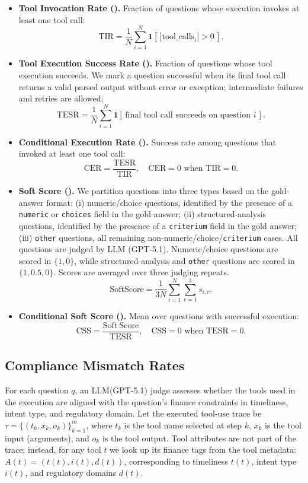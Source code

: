 \begin{itemize}[leftmargin=*]
\item \textbf{Tool Invocation Rate (\tir).} Fraction of questions whose execution invokes at least one tool call:
\[\mathrm{TIR}=\frac{1}{N}\sum_{i=1}^{N}\mathbf{1}\!\left[\,|\mathrm{tool\_calls}_i|>0\,\right].\]
\item \textbf{Tool Execution Success Rate (\tesr).} Fraction of questions whose tool execution succeeds.
We mark a question successful when its final tool call returns a valid parsed output without error or exception; intermediate failures and retries are allowed:
  \[\mathrm{TESR}=\frac{1}{N}\sum_{i=1}^{N}\mathbf{1}\!\left[\,\text{final tool call succeeds on question } i\,\right].\]
\item \textbf{Conditional Execution Rate (\cer).} Success rate among questions that invoked at least one tool call: 
  \[\mathrm{CER}=\frac{\mathrm{TESR}}{\mathrm{TIR}},\quad \mathrm{CER}=0 \text{ when } \mathrm{TIR}=0.\]
\item \textbf{Soft Score (\soft).} 
We partition questions into three types based on the gold-answer format:
(i) numeric/choice questions, identified by the presence of a \texttt{numeric} or \texttt{choices} field in the gold answer;
(ii) structured-analysis questions, identified by the presence of a \texttt{criterium} field in the gold answer;
(iii) \texttt{other} questions, all remaining non-numeric/choice/\texttt{criterium} cases.
All questions are judged by LLM (GPT-5.1). Numeric/choice questions are scored in $\{1,0\}$, while structured-analysis and \texttt{other} questions are scored in $\{1,0.5,0\}$. Scores are averaged over three judging repeats.
\[\mathrm{SoftScore}=\frac{1}{3N}\sum_{i=1}^{N}\sum_{r=1}^{3} s_{i,r}.\]
\item \textbf{Conditional Soft Score (\css).} Mean \soft{} over questions with successful execution:
  \[\mathrm{CSS}=\frac{\mathrm{Soft\ Score}}{\mathrm{TESR}},\quad \mathrm{CSS}=0 \text{ when } \mathrm{TESR}=0.\]
\end{itemize}



\subsection{Compliance Mismatch Rates}

For each question $q$, an LLM(GPT-5.1) judge assesses whether the tools used in the execution are aligned with the question's finance constraints in timeliness, intent type, and regulatory domain.
Let the executed tool-use trace be $\tau=\{(t_k,x_k,o_k)\}_{k=1}^{m}$, where $t_k$ is the tool name selected at step $k$, $x_k$ is the tool input (arguments), and $o_k$ is the tool output.
Tool attributes are not part of the trace; instead, for any tool $t$ we look up its finance tags from the tool metadata:
$A(t)=(t(t), i(t), d(t))$, corresponding to timeliness $t(t)$, intent type $i(t)$, and regulatory domains $d(t)$.

